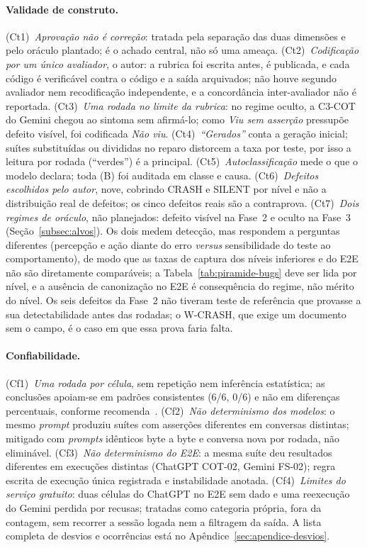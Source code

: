 \documentclass[12pt]{article}
\begin{document}
\paragraph{Validade de construto.} (Ct1)~\emph{Aprovação não é correção}:
tratada pela separação das duas dimensões e pelo oráculo plantado; é o
achado central, não só uma ameaça. (Ct2)~\emph{Codificação por um único
avaliador}, o autor: a rubrica foi escrita antes, é publicada, e cada código
é verificável contra o código e a saída arquivados; não houve segundo
avaliador nem recodificação independente, e a concordância inter-avaliador
não é reportada. (Ct3)~\emph{Uma rodada no limite da rubrica}: no regime oculto, a C3-COT do
Gemini chegou ao sintoma sem afirmá-lo; como \textit{Viu sem asserção}
pressupõe defeito visível, foi codificada \textit{Não viu}.
(Ct4)~\emph{``Gerados''} conta a geração inicial; suítes substituídas ou
divididas no reparo distorcem a taxa por teste, por isso a leitura por
rodada (``verdes'') é a principal. (Ct5)~\emph{Autoclassificação} mede o que
o modelo declara; toda (B) foi auditada em classe e causa.
(Ct6)~\emph{Defeitos escolhidos pelo autor}, nove, cobrindo CRASH e SILENT
por nível e não a distribuição real de defeitos; os cinco defeitos reais são
a contraprova. (Ct7)~\emph{Dois regimes de oráculo}, não planejados: defeito
visível na Fase~2 e oculto na Fase~3 (Seção~\ref{subsec:alvos}). Os dois
medem detecção,
mas respondem a perguntas diferentes (percepção e ação diante do erro
\textit{versus} sensibilidade do teste ao comportamento), de modo que as
taxas de captura dos níveis inferiores e do E2E não são diretamente
comparáveis; a Tabela~\ref{tab:piramide-bugs} deve ser lida por nível, e a
ausência de canonização no E2E é consequência do regime, não mérito do
nível. Os seis defeitos da Fase~2 não tiveram teste de referência que
provasse a sua detectabilidade antes das rodadas; o W-CRASH, que exige um
documento sem o campo, é o caso em que essa prova faria falta.

\paragraph{Confiabilidade.} (Cf1)~\emph{Uma rodada por célula}, sem
repetição nem inferência estatística; as conclusões apoiam-se em padrões
consistentes (6/6, 0/6) e não em diferenças percentuais, conforme
recomenda~\cite{baltes2026guidelines}. (Cf2)~\emph{Não determinismo dos
modelos}: o mesmo \textit{prompt} produziu suítes com asserções diferentes em
conversas distintas; mitigado com \textit{prompts} idênticos byte a byte e conversa
nova por rodada, não eliminável. (Cf3)~\emph{Não determinismo do E2E}: a
mesma suíte deu resultados diferentes em execuções distintas (ChatGPT COT-02,
Gemini FS-02); regra escrita de execução única registrada e instabilidade
anotada. (Cf4)~\emph{Limites do serviço gratuito}: duas células do ChatGPT no
E2E sem dado e uma reexecução do Gemini perdida por recusas; tratadas como
categoria própria, fora da contagem, sem recorrer a sessão logada nem a
filtragem da saída. A lista completa de desvios e ocorrências está no
Apêndice~\ref{sec:apendice-desvios}.
\end{document}
